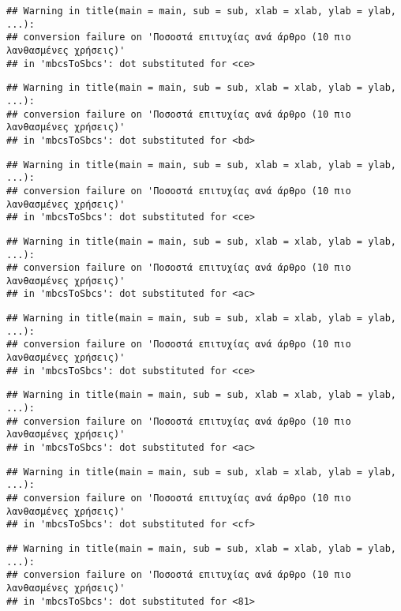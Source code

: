 \documentclass[
]{article}
\begin{document}
\begin{verbatim}
## Warning in title(main = main, sub = sub, xlab = xlab, ylab = ylab, ...):
## conversion failure on 'Ποσοστά επιτυχίας ανά άρθρο (10 πιο λανθασμένες χρήσεις)'
## in 'mbcsToSbcs': dot substituted for <ce>
\end{verbatim}

\begin{verbatim}
## Warning in title(main = main, sub = sub, xlab = xlab, ylab = ylab, ...):
## conversion failure on 'Ποσοστά επιτυχίας ανά άρθρο (10 πιο λανθασμένες χρήσεις)'
## in 'mbcsToSbcs': dot substituted for <bd>
\end{verbatim}

\begin{verbatim}
## Warning in title(main = main, sub = sub, xlab = xlab, ylab = ylab, ...):
## conversion failure on 'Ποσοστά επιτυχίας ανά άρθρο (10 πιο λανθασμένες χρήσεις)'
## in 'mbcsToSbcs': dot substituted for <ce>
\end{verbatim}

\begin{verbatim}
## Warning in title(main = main, sub = sub, xlab = xlab, ylab = ylab, ...):
## conversion failure on 'Ποσοστά επιτυχίας ανά άρθρο (10 πιο λανθασμένες χρήσεις)'
## in 'mbcsToSbcs': dot substituted for <ac>
\end{verbatim}

\begin{verbatim}
## Warning in title(main = main, sub = sub, xlab = xlab, ylab = ylab, ...):
## conversion failure on 'Ποσοστά επιτυχίας ανά άρθρο (10 πιο λανθασμένες χρήσεις)'
## in 'mbcsToSbcs': dot substituted for <ce>
\end{verbatim}

\begin{verbatim}
## Warning in title(main = main, sub = sub, xlab = xlab, ylab = ylab, ...):
## conversion failure on 'Ποσοστά επιτυχίας ανά άρθρο (10 πιο λανθασμένες χρήσεις)'
## in 'mbcsToSbcs': dot substituted for <ac>
\end{verbatim}

\begin{verbatim}
## Warning in title(main = main, sub = sub, xlab = xlab, ylab = ylab, ...):
## conversion failure on 'Ποσοστά επιτυχίας ανά άρθρο (10 πιο λανθασμένες χρήσεις)'
## in 'mbcsToSbcs': dot substituted for <cf>
\end{verbatim}

\begin{verbatim}
## Warning in title(main = main, sub = sub, xlab = xlab, ylab = ylab, ...):
## conversion failure on 'Ποσοστά επιτυχίας ανά άρθρο (10 πιο λανθασμένες χρήσεις)'
## in 'mbcsToSbcs': dot substituted for <81>
\end{verbatim}
\end{document}
